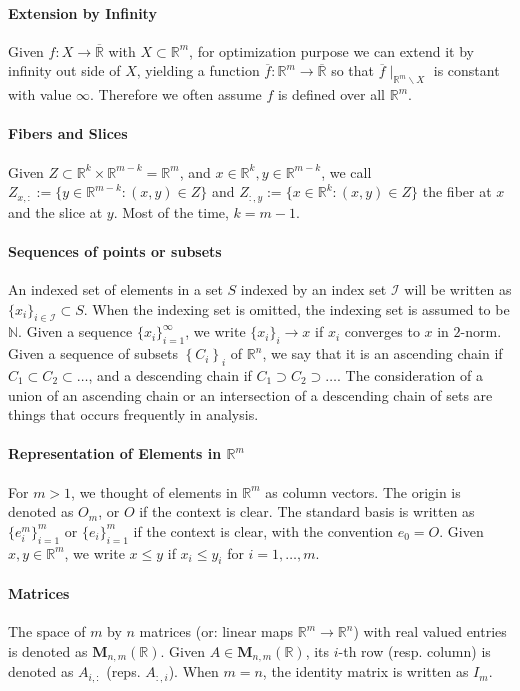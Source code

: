 \paragraph{Extension by Infinity}Given $f:X\to\overline{\mathbb{R}}$ with $X\subset \mathbb{R}^m$, for optimization purpose we can extend it by infinity out side of $X$, yielding a function $\overline{f}:\mathbb{R}^m\to\overline{\mathbb{R}}$ so that $\overline{f}\mid_{\mathbb{R}^m\smallsetminus X}$ is constant with value $\infty$. Therefore we often assume $f$ is defined over all $\mathbb{R}^m$.

\paragraph{Fibers and Slices}Given $Z\subset \mathbb{R}^{k}\times \mathbb{R}^{m-k}=\mathbb{R}^m$, and $x\in \mathbb{R}^k,y\in \mathbb{R}^{m-k}$, we call $Z_{x,:}:=\{y\in \mathbb{R}^{m-k}:(x,y)\in Z\}$ and $Z_{:,y}:=\{x\in \mathbb{R}^{k}:(x,y)\in Z\}$ the fiber at $x$ and the slice at $y$. Most of the time, $k=m-1$.

\paragraph{Sequences of points or subsets}An indexed set of elements in a set $S$ indexed by an index set $\mathcal{I}$ will be written as $\{x_i\}_{i\in \mathcal{I}}\subset S$. When the indexing set is omitted, the indexing set is assumed to be $\mathbb{N}$. Given a sequence $\{x_i\}_{i=1}^\infty$, we write $\{x_i\}_i\to x$ if $x_i$ converges to $x$ in $2$-norm. Given a sequence of subsets $\left\{C_i\right\}_{i}$ of $\mathbb{R}^n$, we say that it is an ascending chain if $C_1\subset C_2\subset \dotsc$, and a descending chain if $C_1\supset C_2\supset \dotsc$. The consideration of a union of an ascending chain or an intersection of a descending chain of sets are things that occurs frequently in analysis.

\paragraph{Representation of Elements in $\mathbb{R}^m$}For $m>1$, we thought of elements in $\mathbb{R}^m$ as column vectors. The origin is denoted as $O_m$, or $O$ if the context is clear. The standard basis is written as $\{e_i^m\}_{i=1}^m$ or $\{e_i\}_{i=1}^m$ if the context is clear, with the convention $e_0=O$. Given $x,y\in \mathbb{R}^m$, we write $x\leq y$ if $x_i\leq y_i$ for $i=1,\dotsc,m$.

\paragraph{Matrices}The space of $m$ by $n$ matrices (or: linear maps $\mathbb{R}^m\to \mathbb{R}^n$) with real valued entries is denoted as $\mathbf{M}_{n,m}(\mathbb{R})$. Given $A\in \mathbf{M}_{n,m}(\mathbb{R})$, its $i$-th row (resp. column) is denoted as $A_{i,:}$ (reps. $A_{:,i}$). When $m=n$, the identity matrix is written as $I_m$.


